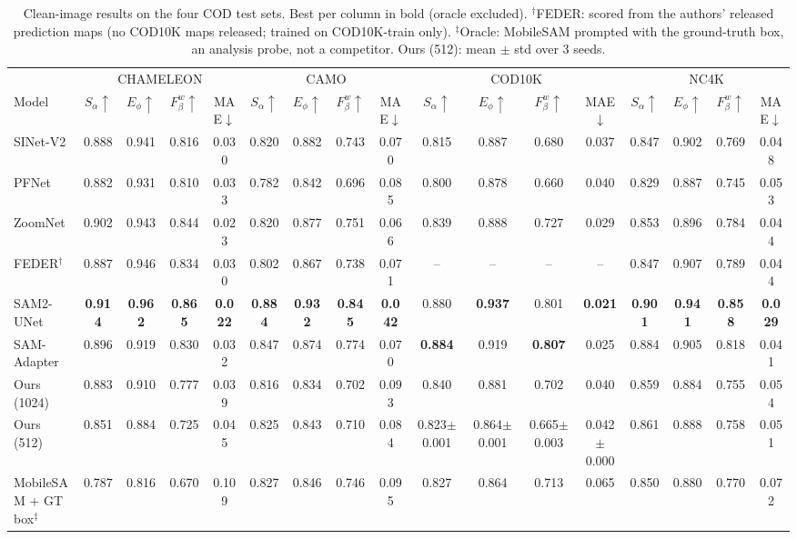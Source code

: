 \begin{table}[t]
\centering
\caption{Clean-image results on the four COD test sets. Best per column in bold (oracle excluded). $^\dagger$FEDER: scored from the authors' released prediction maps (no COD10K maps released; trained on COD10K-train only). $^\ddagger$Oracle: MobileSAM prompted with the ground-truth box, an analysis probe, not a competitor. Ours (512): mean $\pm$ std over 3 seeds.}
\label{tab:clean}
\footnotesize
\setlength{\tabcolsep}{2.6pt}
\begin{tabular}{lcccccccccccccccc}
\toprule
 & \multicolumn{4}{c}{CHAMELEON} & \multicolumn{4}{c}{CAMO} & \multicolumn{4}{c}{COD10K} & \multicolumn{4}{c}{NC4K} \\
\cmidrule(lr){2-5} \cmidrule(lr){6-9} \cmidrule(lr){10-13} \cmidrule(lr){14-17}
Model & $S_\alpha\uparrow$ & $E_\phi\uparrow$ & $F_\beta^w\uparrow$ & MAE$\downarrow$ & $S_\alpha\uparrow$ & $E_\phi\uparrow$ & $F_\beta^w\uparrow$ & MAE$\downarrow$ & $S_\alpha\uparrow$ & $E_\phi\uparrow$ & $F_\beta^w\uparrow$ & MAE$\downarrow$ & $S_\alpha\uparrow$ & $E_\phi\uparrow$ & $F_\beta^w\uparrow$ & MAE$\downarrow$ \\
\midrule
SINet-V2 & 0.888 & 0.941 & 0.816 & 0.030 & 0.820 & 0.882 & 0.743 & 0.070 & 0.815 & 0.887 & 0.680 & 0.037 & 0.847 & 0.902 & 0.769 & 0.048 \\
PFNet & 0.882 & 0.931 & 0.810 & 0.033 & 0.782 & 0.842 & 0.696 & 0.085 & 0.800 & 0.878 & 0.660 & 0.040 & 0.829 & 0.887 & 0.745 & 0.053 \\
ZoomNet & 0.902 & 0.943 & 0.844 & 0.023 & 0.820 & 0.877 & 0.751 & 0.066 & 0.839 & 0.888 & 0.727 & 0.029 & 0.853 & 0.896 & 0.784 & 0.044 \\
FEDER$^\dagger$ & 0.887 & 0.946 & 0.834 & 0.030 & 0.802 & 0.867 & 0.738 & 0.071 & -- & -- & -- & -- & 0.847 & 0.907 & 0.789 & 0.044 \\
\midrule
SAM2-UNet & \textbf{0.914} & \textbf{0.962} & \textbf{0.865} & \textbf{0.022} & \textbf{0.884} & \textbf{0.932} & \textbf{0.845} & \textbf{0.042} & 0.880 & \textbf{0.937} & 0.801 & \textbf{0.021} & \textbf{0.901} & \textbf{0.941} & \textbf{0.858} & \textbf{0.029} \\
SAM-Adapter & 0.896 & 0.919 & 0.830 & 0.032 & 0.847 & 0.874 & 0.774 & 0.070 & \textbf{0.884} & 0.919 & \textbf{0.807} & 0.025 & 0.884 & 0.905 & 0.818 & 0.041 \\
\midrule
Ours (1024) & 0.883 & 0.910 & 0.777 & 0.039 & 0.816 & 0.834 & 0.702 & 0.093 & 0.840 & 0.881 & 0.702 & 0.040 & 0.859 & 0.884 & 0.755 & 0.054 \\
Ours (512) & 0.851 & 0.884 & 0.725 & 0.045 & 0.825 & 0.843 & 0.710 & 0.084 & 0.823{\tiny$\pm$0.001} & 0.864{\tiny$\pm$0.001} & 0.665{\tiny$\pm$0.003} & 0.042{\tiny$\pm$0.000} & 0.861 & 0.888 & 0.758 & 0.051 \\
\midrule
MobileSAM + GT box$^\ddagger$ & 0.787 & 0.816 & 0.670 & 0.109 & 0.827 & 0.846 & 0.746 & 0.095 & 0.827 & 0.864 & 0.713 & 0.065 & 0.850 & 0.880 & 0.770 & 0.072 \\
\bottomrule
\end{tabular}
\end{table}

